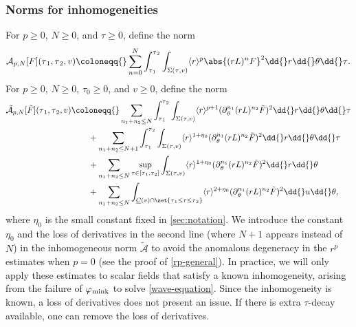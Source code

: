 \documentclass[10pt, reqno]{amsart}
\begin{document}
\subsubsection{Norms for inhomogeneities}
\label{inhomogeneity-norm}
For \(p\ge 0\), \(N\ge 0\), and \(\tau{}\ge 0\), define the norm
\begin{equation}\label{A-norm-def}
\mathcal{A}_{p,N}[F](\tau{}_1,\tau{}_2,v)\coloneqq{}\sum_{n=0}^N\int_{\tau{}_1}^{\tau{}_2} \int _{\Sigma{}(\tau{},v)} \langle{}r\rangle^p\abs{(rL)^nF}^2\dd{}r\dd{}\theta{}\dd{}\tau{}.
\end{equation}
For \(p\ge 0\), \(N\ge 0\), \(\tau_0\ge 0\), and \(v\ge 0\), define the norm
\begin{equation}\label{Anp-def}
\begin{split}
\tilde{\mathcal{A}}_{p,N}[\tilde{F}](\tau{}_1,\tau{}_2,v)&\coloneqq{}\sum_{n_1+n_2\le N}\int_{\tau{}_1}^{\tau{}_2} \int _{\Sigma{}(\tau{},v)}\langle{}r\rangle{}^{p+1}(\partial{}_\theta^{n_1}(rL)^{n_2}\tilde{F})^2\dd{}r\dd{}\theta{}\dd{}\tau{} \\
&\qquad + \sum_{n_1+n_2\le N+1}\int_{\tau{}_1}^{\tau{}_2} \int _{\Sigma{}(\tau{},v)}\langle{}r\rangle{}^{1+\eta{}_0}(\partial{}_\theta^{n_1}(rL)^{n_2}\tilde{F})^2\dd{}r\dd{}\theta{}\dd{}\tau{} \\
&\qquad + \sum_{n_1+n_2\le N}\sup_{\tau{}\in [\tau{}_1,\tau{}_2]}\int _{\Sigma{}(\tau{},v)}\langle{}r\rangle{}^{1+\eta{}_0}(\partial{}_\theta^{n_1}(rL)^{n_2}\tilde{F})^2\dd{}r\dd{}\theta{} \\
&\qquad + \sum_{n_1+n_2\le N}\int _{\underline{C}(v)\cap \set{\tau{}_1\le \tau{}\le \tau{}_2}}\langle{}r\rangle{}^{2+\eta{}_0}(\partial{}_\theta^{n_1}(rL)^{n_2}\tilde{F})^2\dd{}u\dd{}\theta{},
\end{split}
\end{equation}
where \(\eta_0\) is the small constant fixed in \cref{sec:notation}. We introduce the
constant \(\eta_0\) and the loss of derivatives in the second line (where \(N +
1\) appears instead of \(N\)) in the inhomogeneous norm \(\tilde{\mathcal{A}}\)
to avoid the anomalous degeneracy in the \(r^p\) estimates when \(p = 0\) (see
the proof of \cref{rp-general}). In practice, we will only apply these estimates to
scalar fields that satisfy a known inhomogeneity, arising from the failure of
\(\varphi_{\textnormal{mink}}\) to solve \cref{wave-equation}. Since the
inhomogeneity is known, a loss of derivatives does not present an issue. If
there is extra \(\tau{}\)-decay available, one can remove the loss of derivatives.
\end{document}
